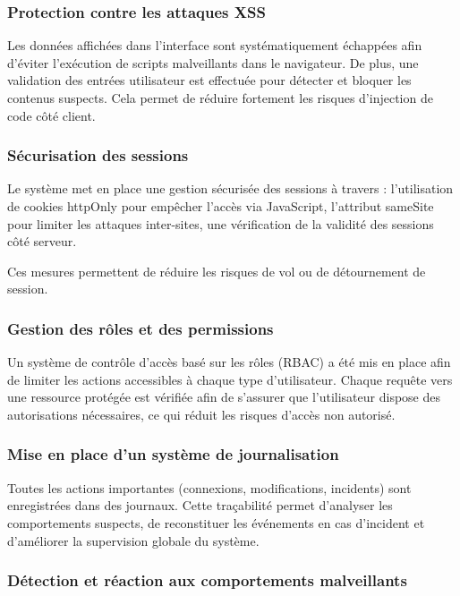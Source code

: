 \documentclass[a4paper,12pt]{report}
\begin{document}
    \subsubsection{Protection contre les attaques XSS}
    
    Les données affichées dans l'interface sont systématiquement échappées afin d'éviter l'exécution de scripts malveillants dans le navigateur. De plus, une validation des entrées utilisateur est effectuée pour détecter et bloquer les contenus suspects. Cela permet de réduire fortement les risques d'injection de code côté client.
    
    \subsubsection{Sécurisation des sessions}
    
    Le système met en place une gestion sécurisée des sessions à travers : l’utilisation de cookies httpOnly pour empêcher l’accès via JavaScript, l’attribut sameSite pour limiter les attaques inter-sites, une vérification de la validité des sessions côté serveur.
    
    Ces mesures permettent de réduire les risques de vol ou de détournement de session.
    
    \subsubsection{Gestion des rôles et des permissions}
    
    Un système de contrôle d’accès basé sur les rôles (RBAC) a été mis en place afin de limiter les actions accessibles à chaque type d’utilisateur. Chaque requête vers une ressource protégée est vérifiée afin de s’assurer que l’utilisateur dispose des autorisations nécessaires, ce qui réduit les risques d’accès non autorisé.
    
    \subsubsection{Mise en place d'un système de journalisation}
    
    Toutes les actions importantes (connexions, modifications, incidents) sont enregistrées dans des journaux. Cette traçabilité permet d’analyser les comportements suspects, de reconstituer les événements en cas d’incident et d’améliorer la supervision globale du système.
    
    \subsubsection{Détection et réaction aux comportements malveillants}
    
\end{document}
